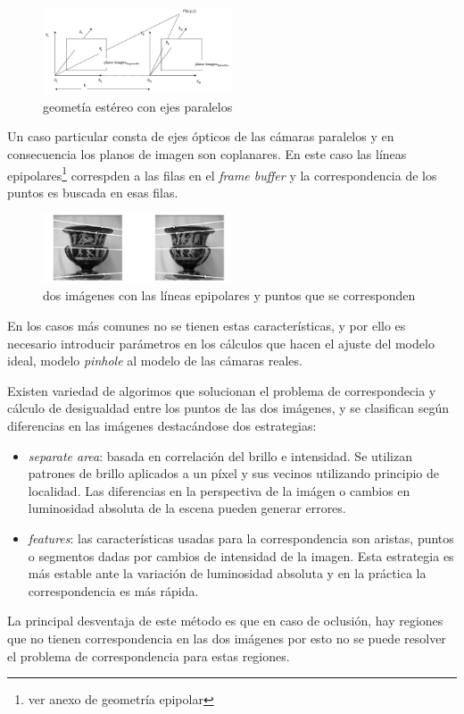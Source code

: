 \begin{figure}[H]
  \centering
    \includegraphics[width=0.5\textwidth]{./Cap2_videomapping/stereo.PNG}
  \caption{geometía estéreo con ejes paralelos}%
  \label{fig:Stereo}
\end{figure}
Un caso particular consta de ejes ópticos de las cámaras paralelos y en consecuencia los planos de imagen son coplanares. En este caso las líneas epipolares\footnote{ver anexo de geometría epipolar} correspden a las filas en el \emph{frame buffer} y la correspondencia de los puntos es buscada en esas filas.
\begin{figure}[H]
  \centering
    \includegraphics[width=0.5\textwidth]{./Cap2_videomapping/epipolar3.PNG}
  \caption{dos imágenes con las líneas epipolares y puntos que se corresponden}%
  \label{fig:Stereo2}
\end{figure}

En los casos más comunes no se tienen estas características, y por ello es necesario introducir parámetros en los cálculos que hacen el ajuste del modelo ideal, modelo \emph{pinhole} al modelo de las cámaras reales. 

Existen variedad de algorimos que solucionan el problema de correspondecia y cálculo de desigualdad entre los puntos de las dos imágenes, y se clasifican según diferencias en las imágenes destacándose dos estrategias:
\begin{itemize}
   \item \emph{separate area}: basada en correlación del brillo e intensidad. Se utilizan patrones de brillo aplicados a un píxel y sus vecinos utilizando principio de localidad. Las diferencias en la perspectiva de la imágen o cambios en luminosidad absoluta de la escena pueden generar errores.
   \item \emph{features}: las características usadas para la correspondencia son aristas, puntos o segmentos dadas por cambios de intensidad de la imagen. Esta estrategia es más estable ante la variación de luminosidad absoluta y en la práctica la correspondencia es más rápida.
\end{itemize}
La principal desventaja de este método es que en caso de oclusión, hay regiones que no tienen correspondencia en las dos imágenes por esto no se puede resolver el problema de correspondencia para estas regiones.

